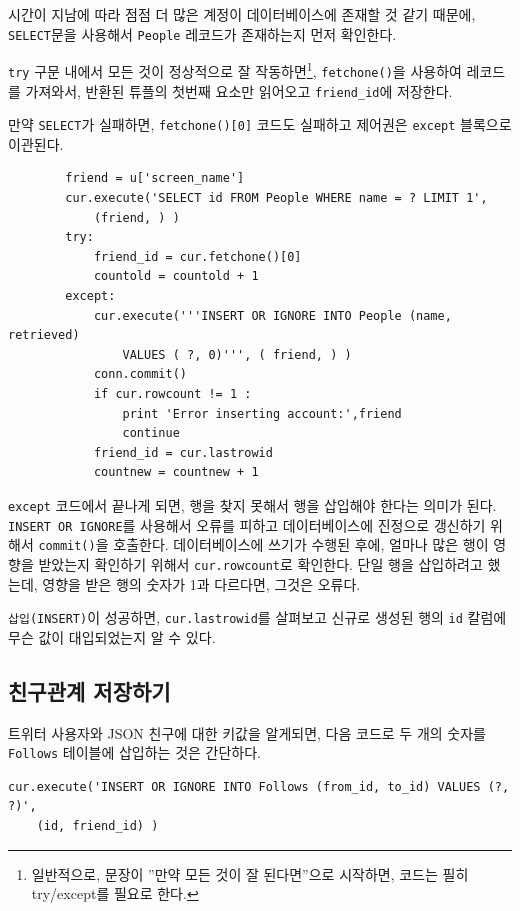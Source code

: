 시간이 지남에 따라 점점 더 많은 계정이 데이터베이스에 존재할 것 같기 때문에, 
{\tt SELECT}문을 사용해서 {\tt People} 레코드가 존재하는지 먼저 확인한다.

{\tt try} 구문 내에서 모든 것이 정상적으로 잘 작동하면\footnote{일반적으로,
문장이 ''만약 모든 것이 잘 된다면''으로 시작하면, 코드는 필히 try/except를 필요로 한다.}, 
{\tt fetchone()}을 사용하여 레코드를 가져와서, 반환된 튜플의 첫번째 요소만 읽어오고 \verb"friend_id"에 저장한다.

만약 {\tt SELECT}가 실패하면, {\tt fetchone()[0]} 코드도 실패하고 제어권은 {\tt except} 블록으로 이관된다.

\beforeverb
\begin{verbatim}
        friend = u['screen_name']
        cur.execute('SELECT id FROM People WHERE name = ? LIMIT 1',
            (friend, ) )
        try:
            friend_id = cur.fetchone()[0]
            countold = countold + 1
        except:
            cur.execute('''INSERT OR IGNORE INTO People (name, retrieved) 
                VALUES ( ?, 0)''', ( friend, ) )
            conn.commit()
            if cur.rowcount != 1 :
                print 'Error inserting account:',friend
                continue
            friend_id = cur.lastrowid
            countnew = countnew + 1
\end{verbatim}
\afterverb
%

{\tt except} 코드에서 끝나게 되면, 행을 찾지 못해서 행을 삽입해야 한다는 의미가 된다.
{\tt INSERT OR IGNORE}를 사용해서 오류를 피하고 데이터베이스에 진정으로 갱신하기 위해서 {\tt commit()}을 호출한다. 
데이터베이스에 쓰기가 수행된 후에, 얼마나 많은 행이 영향을 받았는지 확인하기 위해서 {\tt cur.rowcount}로 확인한다. 
단일 행을 삽입하려고 했는데, 영향을 받은 행의 숫자가 1과 다르다면, 그것은 오류다.

{\tt 삽입(INSERT)}이 성공하면, {\tt cur.lastrowid}를 살펴보고 
신규로 생성된 행의 {\tt id} 칼럼에 무슨 값이 대입되었는지 알 수 있다.

\subsection{친구관계 저장하기}

트위터 사용자와 JSON 친구에 대한 키값을 알게되면, 
다음 코드로 두 개의 숫자를 {\tt Follows} 테이블에 삽입하는 것은 간단하다.

\beforeverb
\begin{verbatim}
cur.execute('INSERT OR IGNORE INTO Follows (from_id, to_id) VALUES (?, ?)',
    (id, friend_id) )
\end{verbatim}
\afterverb
%

